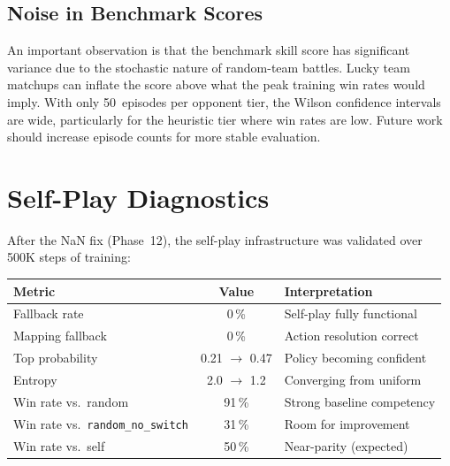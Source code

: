 
\subsection{Noise in Benchmark Scores}

An important observation is that the benchmark skill score has significant
variance due to the stochastic nature of random-team battles.  Lucky team
matchups can inflate the score above what the peak training win rates would
imply.  With only 50~episodes per opponent tier, the Wilson confidence
intervals are wide, particularly for the heuristic tier where win rates are
low.  Future work should increase episode counts for more stable evaluation.

\section{Self-Play Diagnostics}

After the NaN fix (Phase~12), the self-play infrastructure was validated over
500K steps of training:

\begin{center}
\small
\begin{tabularx}{\textwidth}{l c l}
  \toprule
  \textbf{Metric} & \textbf{Value} & \textbf{Interpretation} \\
  \midrule
  Fallback rate       & 0\,\%         & Self-play fully functional \\
  Mapping fallback    & 0\,\%         & Action resolution correct \\
  Top probability     & 0.21 $\to$ 0.47 & Policy becoming confident \\
  Entropy             & 2.0 $\to$ 1.2  & Converging from uniform \\
  Win rate vs.\ random & 91\,\%      & Strong baseline competency \\
  Win rate vs.\ \texttt{random\_no\_switch} & 31\,\% & Room for improvement \\
  Win rate vs.\ self   & 50\,\%      & Near-parity (expected) \\
  \bottomrule
\end{tabularx}
\end{center}


